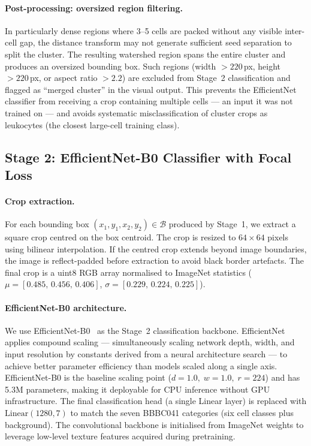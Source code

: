 \documentclass[review,12pt]{elsarticle}
\begin{document}
\paragraph{Post-processing: oversized region filtering.}
In particularly dense regions where 3--5 cells are packed without any
visible inter-cell gap, the distance transform may not generate sufficient
seed separation to split the cluster. The resulting watershed region
spans the entire cluster and produces an oversized bounding box. Such
regions (width $> 220$\,px, height $> 220$\,px, or aspect ratio $> 2.2$)
are excluded from Stage~2 classification and flagged as ``merged cluster''
in the visual output. This prevents the EfficientNet classifier from
receiving a crop containing multiple cells --- an input it was not trained
on --- and avoids systematic misclassification of cluster crops as
leukocytes (the closest large-cell training class).

\subsection{Stage 2: EfficientNet-B0 Classifier with Focal Loss}
\label{ssec:stage2}

\paragraph{Crop extraction.}
For each bounding box $(x_1, y_1, x_2, y_2) \in \mathcal{B}$ produced by
Stage~1, we extract a square crop centred on the box centroid. The crop
is resized to $64 \times 64$ pixels using bilinear interpolation. If the
centred crop extends beyond image boundaries, the image is reflect-padded
before extraction to avoid black border artefacts. The final crop is a
uint8 RGB array normalised to ImageNet statistics ($\mu = [0.485,\,0.456,\,0.406]$,
$\sigma = [0.229,\,0.224,\,0.225]$).

\paragraph{EfficientNet-B0 architecture.}
We use EfficientNet-B0~\cite{tan2019} as the Stage~2 classification
backbone. EfficientNet applies compound scaling --- simultaneously scaling
network depth, width, and input resolution by constants derived from a
neural architecture search --- to achieve better parameter efficiency than
models scaled along a single axis. EfficientNet-B0 is the baseline scaling
point ($d=1.0,\;w=1.0,\;r=224$) and has 5.3M parameters, making it
deployable for CPU inference without GPU infrastructure. The final
classification head (a single Linear layer) is replaced with
$\text{Linear}(1280, 7)$ to match the seven BBBC041 categories (six cell
classes plus background). The convolutional backbone is initialised from
ImageNet weights to leverage low-level texture features acquired during
pretraining.
\end{document}
